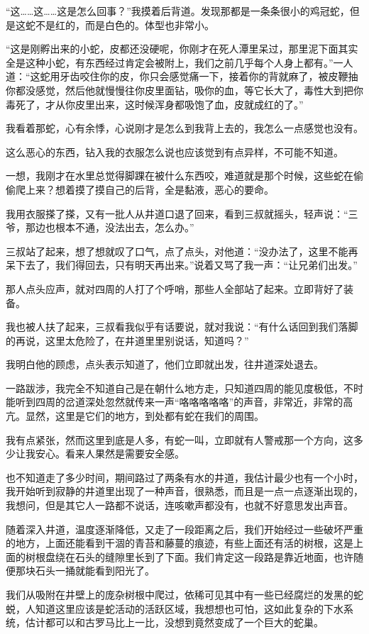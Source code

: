 “这……这……这是怎么回事？”我摸着后背道。发现那都是一条条很小的鸡冠蛇，但是这蛇不是红的，而是白色的。体型也非常小。

“这是刚孵出来的小蛇，皮都还没硬呢，你刚才在死人潭里呆过，那里泥下面其实全是这种小蛇，有东西经过肯定会被附上，我们之前几乎每个人身上都有。”一人道：“这蛇用牙齿咬住你的皮，你只会感觉痛一下，接着你的背就麻了，被皮鞭抽你都没感觉，然后他就慢慢往你皮里面钻，吸你的血，等它长大了，毒性大到把你毒死了，才从你皮里出来，这时候浑身都吸饱了血，皮就成红的了。”

我看着那蛇，心有余悸，心说刚才是怎么到我背上去的，我怎么一点感觉也没有。

这么恶心的东西，钻入我的衣服怎么说也应该觉到有点异样，不可能不知道。

一想，我刚才在水里总觉得脚踝在被什么东西咬，难道就是那个时候，这些蛇在偷偷爬上来？想着摸了摸自己的后背，全是黏液，恶心的要命。

我用衣服搽了搽，又有一批人从井道口退了回来，看到三叔就摇头，轻声说：“三爷，那边也根本不通，没法出去，怎么办。”

三叔站了起来，想了想就叹了口气，点了点头，对他道：“没办法了，这里不能再呆下去了，我们得回去，只有明天再出来。”说着又骂了我一声：“让兄弟们出发。”

那人点头应声，就对四周的人打了个呼哨，那些人全部站了起来。立即背好了装备。

我也被人扶了起来，三叔看我似乎有话要说，就对我说：“有什么话回到我们落脚的再说，这里太危险了，在井道里里别说话，知道吗？”

我明白他的顾虑，点头表示知道了，他们立即就出发，往井道深处退去。

一路跋涉，我完全不知道自己是在朝什么地方走，只知道四周的能见度极低，不时能听到四周的岔道深处忽然就传来一声“咯咯咯咯咯”的声音，非常近，非常的高亢。显然，这里是它们的地方，到处都有蛇在我们的周围。

我有点紧张，然而这里到底是人多，有蛇一叫，立即就有人警戒那一个方向，这多少让我安心。看来人果然是需要安全感。

也不知道走了多少时间，期间路过了两条有水的井道，我估计最少也有一个小时，我开始听到寂静的井道里出现了一种声音，很熟悉，而且是一点一点逐渐出现的，我想问，但是其它人一路都不说话，连咳嗽声都没有，也就不好意思发出声音。

随着深入井道，温度逐渐降低，又走了一段距离之后，我们开始经过一些破坏严重的地方，上面还能看到干涸的青苔和藤蔓的痕迹，有些上面还有活的树根，这是上面的树根盘绕在石头的缝隙里长到了下面。我们肯定这一段路是靠近地面，也许随便那块石头一捅就能看到阳光了。

我们从吸附在井壁上的庞杂树根中爬过，依稀可见其中有一些已经腐烂的发黑的蛇蜕，人知道这里应该是蛇活动的活跃区域，我想想也可怕，这如此复杂的下水系统，估计都可以和古罗马比上一比，没想到竟然变成了一个巨大的蛇巢。


